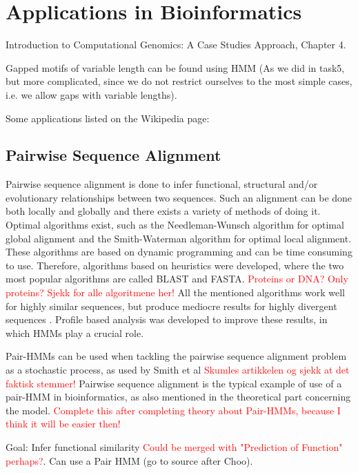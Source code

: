 \documentclass{article}
\begin{document}
\section{Applications in Bioinformatics}
Introduction to Computational Genomics: A Case Studies Approach, Chapter 4. 

Gapped motifs of variable length can be found using HMM (As we did in task5, but more complicated, since we do not restrict ourselves to the most simple cases, i.e. we allow gaps with variable lengths). 

Some applications listed on the Wikipedia page: 

\subsection{Pairwise Sequence Alignment}
Pairwise sequence alignment is done to infer functional, structural and/or evolutionary relationships between two sequences. Such an alignment can be done both locally and globally and there exists a variety of methods of doing it. Optimal algorithms exist, such as the Needleman-Wunsch algorithm for optimal global alignment and the Smith-Waterman algorithm for optimal local alignment. These algorithms are based on dynamic programming and can be time consuming to use. Therefore, algorithms based on heuristics were developed, where the two most popular algorithms are called BLAST and FASTA. \textcolor{red}{Proteins or DNA? Only proteins? Sjekk for alle algoritmene her!} All the mentioned algorithms work well for highly similar sequences, but produce mediocre results for highly divergent sequences \cite{Choo2004}. Profile based analysis was developed to improve these results, in which HMMs play a crucial role. 

Pair-HMMs can be used when tackling the pairwise sequence alignment problem as a stochastic process, as used by Smith et al \cite{Smith2003} \textcolor{red}{Skumles artikkelen og sjekk at det faktisk stemmer!} Pairwise sequence alignment is the typical example of use of a pair-HMM in bioinformatics, as also mentioned in the theoretical part concerning the model. \textcolor{red}{Complete this after completing theory about Pair-HMMs, because I think it will be easier then!}

Goal: Infer functional similarity \textcolor{red}{Could be merged with "Prediction of Function" perhaps?}. Can use a Pair HMM \cite{Choo2004} (go to source after Choo). 
\end{document}

